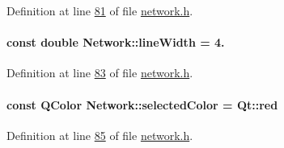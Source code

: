 Definition at line \hyperlink{network_8h_source_l00081}{81} of file \hyperlink{network_8h_source}{network.\+h}.

\hypertarget{group___graphics_ga3f810634c9908d62d33a1ab09a76c147}{}
\paragraph[{line\+Width}]{\setlength{\rightskip}{0pt plus 5cm}const double Network\+::line\+Width = 4.\hspace{0.3cm}{\ttfamily [static]}}\label{group___graphics_ga3f810634c9908d62d33a1ab09a76c147}


Definition at line \hyperlink{network_8h_source_l00083}{83} of file \hyperlink{network_8h_source}{network.\+h}.

\hypertarget{group___graphics_gaa9e21b8e2a24b0495e776a51e1aeed94}{}
\paragraph[{selected\+Color}]{\setlength{\rightskip}{0pt plus 5cm}const Q\+Color Network\+::selected\+Color = Qt\+::red\hspace{0.3cm}{\ttfamily [static]}}\label{group___graphics_gaa9e21b8e2a24b0495e776a51e1aeed94}


Definition at line \hyperlink{network_8h_source_l00085}{85} of file \hyperlink{network_8h_source}{network.\+h}.

